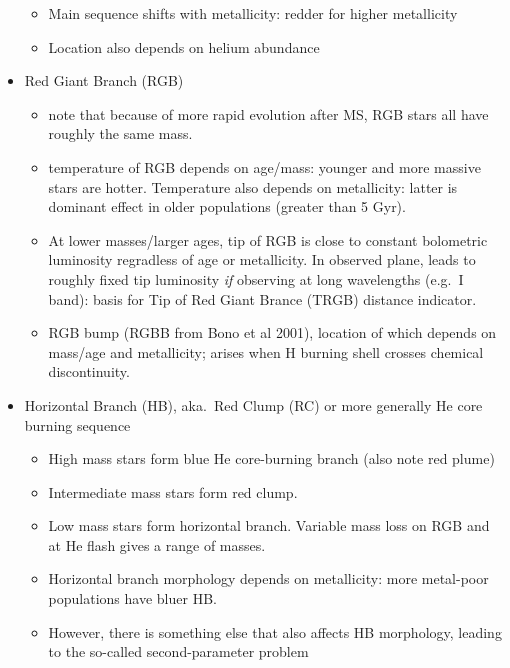 \documentclass{article}
\begin{document}
\begin{itemize}
\begin{itemize}
            \item Main sequence shifts with metallicity: redder for
                higher metallicity
            \item Location also depends on helium abundance
        \end{itemize}
    \item Red Giant Branch (RGB)
        \begin{itemize}
            \item note that because of more rapid evolution after MS,
                RGB stars all have roughly the same mass.
            \item temperature of RGB depends on age/mass: younger and more
                massive stars are hotter. Temperature also depends on
                metallicity: latter is dominant effect in older populations
                (greater than 5 Gyr).
            \item At lower masses/larger ages, tip of RGB is close to
                constant bolometric luminosity regradless of age or
                metallicity. In observed plane, leads to roughly fixed
                tip luminosity \emph{if} observing at long wavelengths
                (e.g.\ I band): basis for Tip of Red Giant Brance (TRGB)
                distance indicator.
            \item RGB bump (RGBB from
                Bono et al 2001),
                location of which depends on mass/age and metallicity;
                arises when H burning shell crosses chemical discontinuity.
        \end{itemize}
    \item Horizontal Branch (HB), aka.\ Red Clump (RC) or more generally
        He core burning sequence
        \begin{itemize}
            \item High mass stars form blue He core-burning branch
                (also note red plume)
            \item Intermediate mass stars form red clump.
            \item Low mass stars form horizontal branch. Variable mass loss
                on RGB and at He flash gives a range of masses.
            \item Horizontal branch morphology depends on metallicity: more
                metal-poor populations have bluer HB.
            \item However, there is something else that also affects HB
                morphology, leading to the so-called second-parameter problem

\end{itemize}
\end{itemize}
\end{document}
